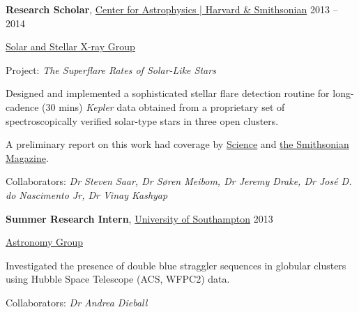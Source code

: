 \documentclass[11pt]{article}
\newcommand{\halfblankline}{\quad\vspace{-0.5\baselineskip}\pagebreak[3]}
\begin{document}
\halfblankline

 \textbf{Research Scholar},
	\href{https://www.cfa.harvard.edu/}{Center for Astrophysics | Harvard \& Smithsonian} \hfill {2013 -- 2014}
\begin{innerlist}

    \item[] \href{https://www.cfa.harvard.edu/research/hea/sun}{Solar and Stellar X-ray Group}
    \begin{innerlist}
   	 \item[] Project: \emph{The Superflare Rates of Solar-Like Stars}
    	\item{} Designed and implemented a sophisticated stellar flare detection routine for long-cadence (30 mins) {\it Kepler} data obtained from a proprietary set of spectroscopically verified solar-type stars in three open clusters.\item{} A preliminary report on this work had coverage by \href{http://www.sciencemag.org/news/2015/08/when-sun-s-next-superflare-due?rss=1}{Science} and \href{http://www.smithsonianmag.com/smart-news/when-next-solar-superflare-hit-earth-180956288/}{the Smithsonian Magazine}.%
    \end{innerlist}    	
    	\item[] Collaborators: {\it Dr Steven Saar, Dr S{\o}ren Meibom, Dr Jeremy Drake, Dr Jos{\'e} D. do Nascimento Jr, Dr Vinay Kashyap}
\end{innerlist}
\halfblankline

 \textbf{Summer Research Intern},
	\href{http://www.soton.ac.uk/}{University of Southampton} \hfill {2013}
\begin{innerlist}

    \item[] \href{http://www.astro.soton.ac.uk/}{Astronomy Group}
    \begin{innerlist}
    	\item{} Investigated the presence of double blue straggler sequences in globular clusters using Hubble Space Telescope (ACS, WFPC2) data.
    \end{innerlist}    	
    	\item[] Collaborators: {\it Dr Andrea Dieball}

\end{innerlist}

 
%
\end{document}
